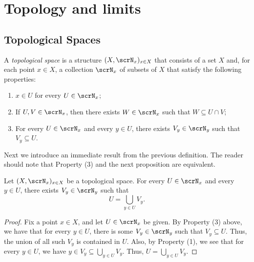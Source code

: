 \chapter{Topology and limits}

\section{Topological Spaces}
\label{sec:topology}

\begin{definition}
  \label{def:topological-space}
  A \emph{topological space} is a structure $(X, \scrN_x)_{x\in X}$  that consists of a set $X$ and, for each point $x\in X$, a collection $\scrN_x$ of subsets of $X$ that satisfy the following properties:

  \begin{enumerate}
  \item
    $x\in U$ for every $U\in \scrN_x$;
  \item
    If $U,V\in \scrN_x$, then there exists $W\in \scrN_x$ such that $W\subseteq U\cap V$;
  \item
    For every $U\in \scrN_x$ and every $y\in U$, there exists $V_y\in \scrN_y$ such that $V_y\subseteq U$.

  \end{enumerate}
\end{definition}

Next we introduce an immediate result from the previous definition.
The reader should note that Property (3) and the next proposition are equivalent.

\begin{proposition}
  \label{prop:basic-nhoods-are-open}
  Let $(X, \scrN_x)_{x\in X}$ be a topological space.
  For every $U\in \scrN_x$ and every $y\in U$, there exists $V_y\in \scrN_y$ such that \[U=\bigcup\limits_{y\in U}V_y\text{.}\]
\end{proposition}

\begin{proof}
  Fix a point $x\in X$, and let $U\in \scrN_x$ be given.
  By Property (3) above, we have that for every $y\in U$, there is some $V_y\in \scrN_y$ such that $V_y\subseteq U$.
  Thus, the union of all such $V_y$ is contained in $U$.
  Also, by Property (1), we see that for every $y\in U$, we have $y\in V_y\subseteq \bigcup\limits_{y\in U}V_y$.
  Thus, $U=\bigcup\limits_{y\in U}V_y$.
\end{proof}

